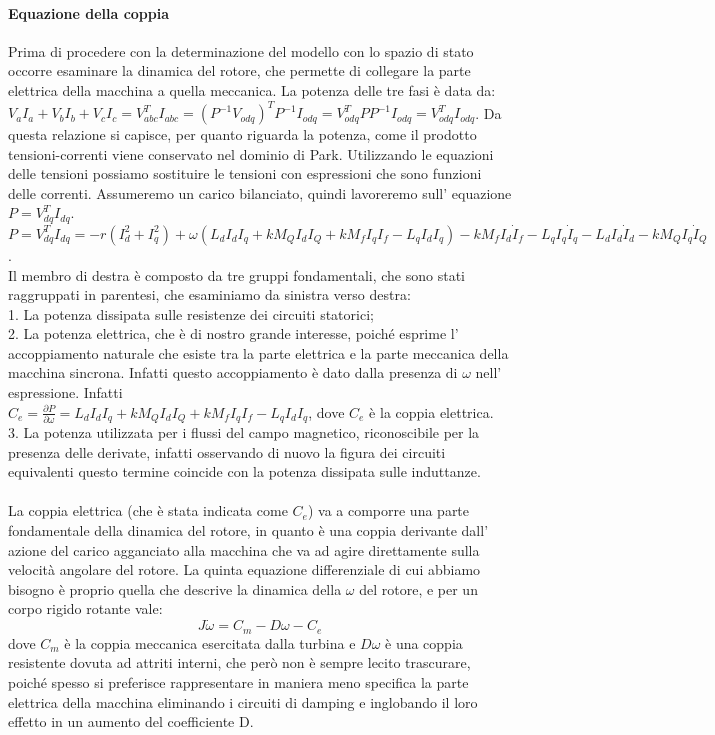 \documentclass[Lau,noexaminfo]{sapthesis}
\begin{document}
	\paragraph{Equazione della coppia}
	Prima di procedere con la determinazione del modello con lo spazio di stato occorre esaminare la dinamica del rotore, che permette di collegare la parte elettrica della macchina a quella meccanica. La potenza delle tre fasi è data da:\\
	$V_a I_a + V_b I_b + V_c I_c = V^T_{abc} I_{abc}=(P^{-1}V_{odq})^T P^{-1}I_{odq}=V_{odq}^T P P^{-1} I_{odq}=V_{odq}^T I_{odq}$. Da questa relazione si capisce, per quanto riguarda la potenza, come il prodotto tensioni-correnti viene conservato nel dominio di Park. Utilizzando le equazioni delle tensioni possiamo sostituire le tensioni con espressioni che sono funzioni delle correnti. Assumeremo un carico bilanciato, quindi lavoreremo sull' equazione\\
	$P=V_{dq}^T I_{dq}$.\\
	$P=V_{dq}^T I_{dq}=-r(I_d^2+I_q^2) + \omega(L_d I_dI_q +kM_QI_dI_Q+kM_f I_qI_f-L_qI_dI_q) -kM_f I_d \dot{I}_f -L_qI_q \dot{I}_q - L_dI_d\dot{I}_d -kM_QI_q\dot{I}_Q$.\\
	Il membro di destra è composto da tre gruppi fondamentali, che sono stati raggruppati in parentesi, che esaminiamo da sinistra verso destra:\\
	1. La potenza dissipata sulle resistenze dei circuiti statorici;\\
	2. La potenza elettrica, che è di nostro grande interesse, poiché esprime l' accoppiamento naturale che esiste tra la parte elettrica e la parte meccanica della macchina sincrona. Infatti questo accoppiamento è dato dalla presenza di $\omega$ nell' espressione. Infatti\\
	$C_e=\frac{\partial P}{\partial \omega} = L_dI_dI_q+kM_QI_dI_Q+kM_fI_qI_f-L_qI_dI_q $, dove $C_e$ è la coppia elettrica.\\
	3. La potenza utilizzata per i flussi del campo magnetico, riconoscibile per la presenza delle derivate, infatti osservando di nuovo la figura dei circuiti equivalenti questo termine coincide con la potenza dissipata sulle induttanze.\\\\
	La coppia elettrica (che è stata indicata come $C_e$) va a comporre una parte fondamentale della dinamica del rotore, in quanto è una coppia derivante dall' azione del carico agganciato alla macchina che va ad agire direttamente sulla velocità angolare del rotore. La quinta equazione differenziale di cui abbiamo bisogno è proprio quella che descrive la dinamica della $\omega$ del rotore, e per un corpo rigido rotante vale:\\
	\begin{equation}
	J\dot{\omega}=C_m - D\omega - C_e 
	\end{equation} dove $C_m$ è la coppia meccanica esercitata dalla turbina e $D\omega$ è una coppia resistente dovuta ad attriti interni, che però non è sempre lecito trascurare, poiché spesso si preferisce rappresentare in maniera meno specifica la parte elettrica della macchina eliminando i circuiti di damping e inglobando il loro effetto in un aumento del coefficiente D.
\end{document}
